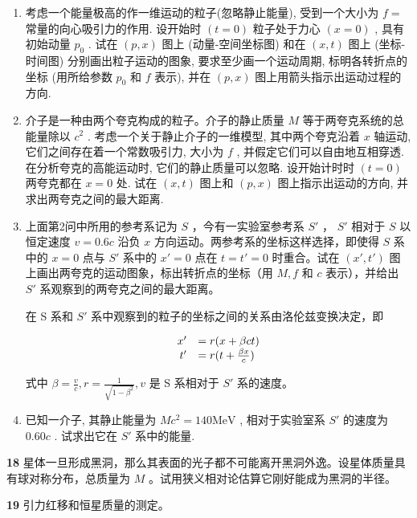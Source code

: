 \begin{enumerate}
\item 考虑一个能量极高的作一维运动的粒子(忽略静止能量), 受到一个大小为 $f =$ 常量的向心吸引力的作用. 设开始时 $(t = 0)$ 粒子处于力心 $(x = 0)$ , 具有初始动量 $p_0$ . 试在 $(p, x)$ 图上 (动量-空间坐标图) 和在 $(x, t)$ 图上 (坐标-时间图) 分别画出粒子运动的图象, 要求至少画一个运动周期, 标明各转折点的坐标 (用所给参数 $p_0$ 和 $f$ 表示), 并在 $(p, x)$ 图上用箭头指示出运动过程的方向.

\item 介子是一种由两个夸克构成的粒子。介子的静止质量 $M$ 等于两夸克系统的总能量除以 $c^2$ .
考虑一个关于静止介子的一维模型, 其中两个夸克沿着 $x$ 轴运动, 它们之间存在着一个常数吸引力, 大小为 $f$ , 并假定它们可以自由地互相穿透. 在分析夸克的高能运动时, 它们的静止质量可以忽略. 设开始计时时 $(t = 0)$ 两夸克都在 $x = 0$ 处. 试在 $(x, t)$ 图上和 $(p, x)$ 图上指示出运动的方向, 并求出两夸克之间的最大距离.

\item 上面第2问中所用的参考系记为 $S$ ，今有一实验室参考系 $S'$ ， $S'$ 相对于 $S$ 以恒定速度 $v = 0.6c$ 沿负 $x$ 方向运动。两参考系的坐标这样选择，即使得 $S$ 系中的 $x = 0$ 点与 $S'$ 系中的 $x' = 0$ 点在 $t = t' = 0$ 时重合。试在 $(x', t')$ 图上画出两夸克的运动图象，标出转折点的坐标（用 $M, f$ 和 $c$ 表示），并给出 $S'$ 系观察到的两夸克之间的最大距离。

在 S 系和 $S'$ 系中观察到的粒子的坐标之间的关系由洛伦兹变换决定，即

$$
\begin{array}{r l} x ^ {\prime} & = r (x + \beta c t) \\ t ^ {\prime} & = r (t + \frac {\beta x}{c}) \end{array}
$$

式中 $\beta=\frac{v}{c}, r=\frac{1}{\sqrt{1-\beta^{2}}}, v$ 是 S 系相对于 $S'$ 系的速度。

\item 已知一介子, 其静止能量为 $Mc^2 = 140\mathrm{MeV}$ , 相对于实验室系 $S'$ 的速度为 $0.60c$ . 试求出它在 $S'$ 系中的能量.
\end{enumerate}
\vfill

\textbf{18}
星体一旦形成黑洞，那么其表面的光子都不可能离开黑洞外逸。设星体质量具有球对称分布，总质量为 $M$ 。试用狭义相对论估算它刚好能成为黑洞的半径。
\vfill

\newpage
\textbf{19}
引力红移和恒星质量的测定。

